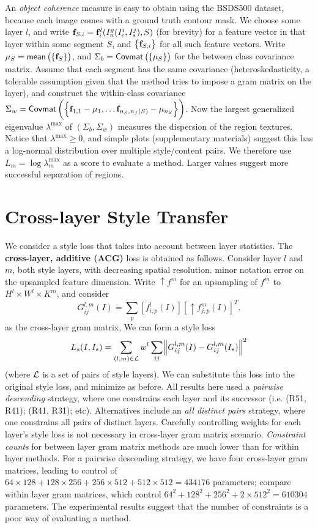 \documentclass[runningheads]{llncs}
\newcommand{\vect}[1]{{\bf {#1}}}
\begin{document}
An \textit{object coherence} measure is easy to obtain using the BSDS500 dataset, because each image comes with a ground truth contour
mask.  We choose some layer $l$, and write $\vect{f}_{S,i}=\vect{f}_{i}^{l}(I^g_n(I_c^i,I_s^j), S)$ (for brevity) for a feature
vector in that layer within some segment $S$, and $\left\{\vect{f}_{S,i}\right\}$ for all such feature
vectors.  Write $\mu_S=\mean{\vect{f}_S}$, and $\Sigma_b={ {\small {\mathsf{Covmat}} \left( \left\{ {{\mu_S}} \right\} \right) }}$ for the between class covariance matrix.
Assume that each segment has the same covariance (heteroskedasticity,
a tolerable assumption given that the method tries to impose a gram matrix on the layer), and construct the within-class
covariance $\Sigma_w=\covmat{\vect{f}_{1,1}-\mu_1, \ldots \vect{f}_{n_S,n_f(S)}-\mu_{n_S}}$.  Now the
largest generalized eigenvalue $\lambda^{\mbox{max}}$ of $(\Sigma_b, \Sigma_w)$ measures the dispersion of the region
textures.   Notice that $\lambda^{\mbox{max}}\geq 0$, and simple plots (supplementary materials) suggest this has a
log-normal distribution over multiple style/content pairs.  We therefore use $L_m=\log \lambda^{\mbox{max}}_{m}$ as a
score to evaluate a method.  Larger values suggest more successful separation of regions.

\section{Cross-layer Style Transfer}\label{sec:Cross}

We consider a style loss that takes into account between layer statistics.  The {\bf cross-layer, additive (ACG)} loss
is obtained as follows.  Consider layer $l$ and $m$, both style layers, with decreasing 
spatial resolution.  
\todo minor notation error on the upsampled feature dimension.
Write $\uparrow f^{m}$ for an upsampling of  $f^m$ to $H^l\times W^l \times K^m$, and consider
\[
G_{ij}^{l,m}(I) = \sum_{p} \left[ f_{i,p}^l(I)\right]\left[\uparrow {f}_{j,p}^{m}(I)\right]^{T}.
\]
as the cross-layer gram matrix, We can form a style loss
\[
L_s(I, I_{s}) = \sum_{(l, m)\in {\cal L}} w^{l}\sum_{ij} \norm{G^{l,m}_{ij}(I)-G^{l,m}_{ij}(I_s)}^2
\]
(where ${\cal L}$ is a set of pairs of style layers).   We can substitute this loss into the original style loss, and
minimize as before.  All results here used a {\em pairwise descending} strategy, where one constrains each layer and its
successor (i.e. (R51, R41); (R41, R31); etc).  Alternatives include an {\em all distinct pairs} strategy, where one constrains all pairs of distinct
layers. Carefully controlling weights for each layer's style loss is not necessary in cross-layer gram matrix scenario.  
{\em Constraint counts} for between layer gram matrix methods are much lower than for within layer methods.  For a
pairwise descending strategy,  we have four cross-layer gram matrices, leading to  control of $64\times
128+128\times 256+256\times 512+512\times 512 = 434176 $ parameters; compare within layer gram matrices, which control 
$64^2+128^2+256^2+2\times512^2 = 610304$ parameters.  The experimental results suggest that the number of constraints is
a poor way of evaluating a method.
\end{document}
